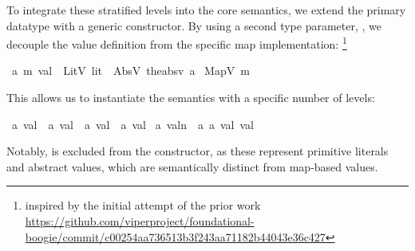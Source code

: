 To integrate these stratified levels into the core semantics,
we extend the primary  datatype with a generic  constructor.
By using a second type parameter, , we decouple the value definition from the specific map implementation:
\footnote{inspired by the initial attempt of the prior work
\url{https://github.com/viperproject/foundational-boogie/commit/c00254aa736513b3f243aa71182b44043e36c427}}


\begin{isabellebody}\isanewline
{}\isamarkupfalse%
\ {\isacharparenleft}{\kern0pt}{\isacharprime}{\kern0pt}a{\isacharcomma}{\kern0pt}\ {\isacharprime}{\kern0pt}m{\isacharparenright}{\kern0pt}\ val\ {\isacharequal}{\kern0pt}\ LitV\ lit\ {\isacharbar}{\kern0pt}\ AbsV\ {\isacharparenleft}{\kern0pt}the{\isacharunderscore}{\kern0pt}absv{\isacharcolon}{\kern0pt}\ {\isacharprime}{\kern0pt}a{\isacharparenright}{\kern0pt}
{\isacharbar}{\kern0pt}\ MapV\ {\isacharprime}{\kern0pt}m\isanewline
\end{isabellebody}


This allows us to instantiate the semantics with a specific number of levels:

\begin{isabellebody}\isanewline
{}\isamarkupfalse%
\ {\isacharprime}{\kern0pt}a\ val{}{}{}\ {\isacharequal}{\kern0pt}\ {\isachardoublequoteopen}{\isacharprime}{\kern0pt}a\ val{}\ {\isacharplus}{\kern0pt}\ {\isacharprime}{\kern0pt}a\ val{}\ {\isacharplus}{\kern0pt}\ {\isacharprime}{\kern0pt}a\ val{}{\isachardoublequoteclose}\isanewline
{}\isamarkupfalse%
\ {\isacharprime}{\kern0pt}a\ valn\ {\isacharequal}{\kern0pt}\ {\isachardoublequoteopen}{\isacharparenleft}{\kern0pt}{\isacharprime}{\kern0pt}a{\isacharcomma}{\kern0pt}\ {\isacharprime}{\kern0pt}a\ val{}{}{}{\isacharparenright}{\kern0pt}\ val{\isachardoublequoteclose}\ %
\end{isabellebody}


Notably,  is excluded from the  constructor,
as these represent primitive literals and abstract values, which are semantically distinct from map-based values.

